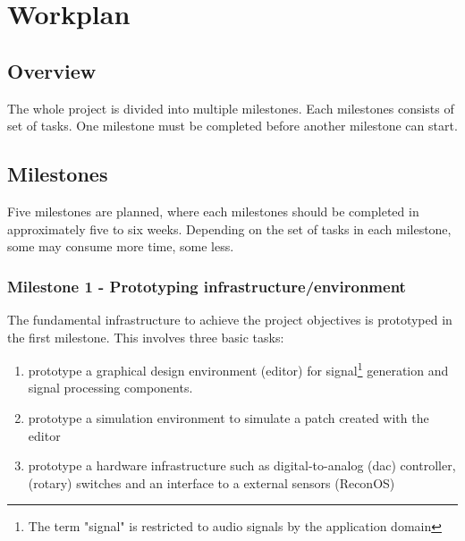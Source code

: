 
\chapter{Workplan}
\label{chapter:Workplan}

\section{Overview}


The whole project is divided into multiple milestones. Each milestones consists of set of tasks. One milestone must be completed before another milestone can start.

\section{Milestones}

Five milestones are planned, where each milestones should be completed in approximately five to six weeks. Depending on the set of tasks in each milestone, some may consume more time, some less.

\subsection{Milestone 1 - Prototyping infrastructure/environment}

The fundamental infrastructure to achieve the project objectives is prototyped in the first milestone. This involves three basic tasks:

\begin{enumerate}
	\item prototype a graphical design environment (editor) for signal\footnote{The term "signal" is restricted to audio signals by the application domain} generation and signal processing components. 
	\item prototype a simulation environment to simulate a patch created with the editor
	\item prototype a hardware infrastructure such as digital-to-analog (dac) controller, (rotary) switches and an interface to a external sensors (ReconOS)
\end{enumerate}

